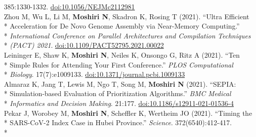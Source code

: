 \documentclass[margin,line]{res}
\begin{document}
\begin{resume}
\hspace*{8mm} 385:1330-1332. \href{https://doi.org/10.1056/NEJMc2112981}{doi:10.1056/NEJMc2112981}\\
\hspace*{4mm} Zhou M, Wu L, Li M, \textbf{Moshiri N}, Skadron K, Rosing T (2021). ``Ultra Efficient\\*
\hspace*{9mm} Acceleration for De Novo Genome Assembly via Near-Memory Computing.''\\*
\hspace*{9mm} \textit{International Conference on Parallel Architectures and Compilation Techniques}\\*\vspace{2mm}
\hspace*{8mm} \textit{(PACT) 2021}. \href{https://doi.org/10.1109/PACT52795.2021.00022}{doi:10.1109/PACT52795.2021.00022}\\
\hspace*{4mm} Leininger E, Shaw K, \textbf{Moshiri N}, Neiles K, Onsongo G, Ritz A (2021). ``Ten\\*
\hspace*{9mm} Simple Rules for Attending Your First Conference.'' \textit{PLOS Computational}\\*\vspace{2mm}
\hspace*{8mm} \textit{Biology}. 17(7):e1009133. \href{https://doi.org/10.1371/journal.pcbi.1009133}{doi:10.1371/journal.pcbi.1009133}\\
\hspace*{4mm} Almaraz K, Jang T, Lewis M, Ngo T, Song M, \textbf{Moshiri N} (2021). ``SEPIA:\\*
\hspace*{9mm} Simulation-based Evaluation of Prioritization Algorithms.'' \textit{BMC Medical}\\*\vspace{2mm}
\hspace*{8mm} \textit{Informatics and Decision Making}. 21:177. \href{https://doi.org/10.1186/s12911-021-01536-4}{doi:10.1186/s12911-021-01536-4}\\
\hspace*{4mm} Pekar J, Worobey M, \textbf{Moshiri N}, Scheffler K, Wertheim JO (2021). ``Timing the\\*
\hspace*{9mm} SARS-CoV-2 Index Case in Hubei Province.'' \textit{Science}. 372(6540):412-417.\\*\vspace{2mm}

\end{resume}
\end{document}
